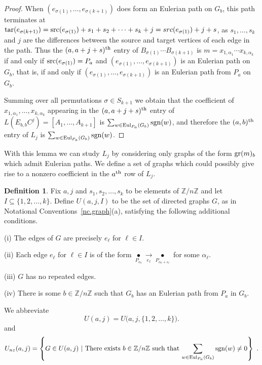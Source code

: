 \documentclass{amsproc}
\theoremstyle{definition}
\newtheorem{definition}[theorem]{Definition}
\theoremstyle{remark}
\numberwithin{equation}{section}
\newcommand{\Z}{{\mathbb Z}}
\newcommand{\sgn}{{\rm sgn}}
\newcommand{\gr}{{\rm gr}}
\newcommand{\src}{{\rm src}}
\newcommand{\tar}{{\rm tar}}
\newcommand{\uni}{{\rm Eul}}
\begin{document}
\begin{proof}
When $(e_{\sigma(1)},\dots,e_{\sigma(k+1)})$ does form an Eulerian path on $G_b$, this path terminates at $\tar(e_{\sigma(k+1)})=\src(e_{\sigma(1)})+s_1+s_2+\dots+s_k+j=src(e_{\sigma(1)})+j+s$, as $s_1,\dots,s_k$ and $j$ are the differences between the source and target vertices of each edge in the path. Thus the $(a,a+j+s)^{\rm th}$ entry of $B_{\sigma(1)}\cdots B_{\sigma(k+1)}$ is $m = x_{1,\alpha_1}\cdots x_{k,\alpha_k}$ if and only if $\src(e_{\sigma(1)})=P_a$ and $(e_{\sigma(1)},\dots,e_{\sigma(k+1)})$ is an Eulerian path on $G_b$, that is, if and only if $(e_{\sigma(1)},\dots,e_{\sigma(k+1)})$ is an Eulerian path from $P_a$ on $G_b$.

Summing over all permutations $\sigma\in S_{k+1}$ 
we obtain that the coefficient of $x_{1,\alpha_1},\dots,x_{k,\alpha_k}$ appearing in the $(a,a+j+s)^{\rm th}$ entry of 
$L(E_{b, b}C^j)=[A_1,\dots,A_{k+1}]$ is $\sum_{w\in \uni_{P_a}(G_b)}\sgn(w)$, and therefore the $(a,b)^{\rm th}$ entry of $L_j$ is $\sum_{w\in \uni_{P_a}(G_b)}\sgn(w)$.
\end{proof}

With this lemma we can study $L_j$ by considering only graphs of the form $\gr(m)_b$ which admit Eulerian paths. We define a set of graphs which could possibly give rise to a nonzero coefficient in the $a^{\rm th}$ row of $L_j$.

\begin{definition} \label{U_gen_def}
Fix $a,j$ and $s_1,s_2,\dots,s_k$ to be elements of $\Z/n\Z$ and let $I\subseteq\{1,2,\dots,k\}$. Define $U(a,j,I)$ 
to be the set of directed graphs $G$, as in Notational Conventions~\ref{nc.graph}(a), satisfying the following additional conditions.

\smallskip
(i) The edges of $G$ are precisely $e_\ell$ for $\ell\in I$.

\smallskip
(ii) Each edge $e_\ell$ for $\ell\in I$ is of the form $\underset {P_{\alpha_\ell}} \bullet \underset {e_\ell} \longrightarrow \underset {P_{\alpha_\ell+s_\ell}} \bullet$ for some $\alpha_\ell$.

\smallskip
(iii) $G$ has no repeated edges.

\smallskip
(iv) There is some $b \in \Z/n\Z$ such that $G_b$ has an Eulerian path from $P_a$ in $G_b$.

\smallskip
\noindent
We abbreviate
\[U(a,j)=U\big(a,j,\{1,2,\dots,k\}\big) . \]
and
\[U_{nz}(a,j)=\left\{G\in U(a,j)\ |\ \text{There exists $b\in\Z/n\Z$ such that $\sum_{w\in \uni_{P_a}(G_b)}\sgn(w)\neq 0$}\right\}\ .\]

\end{definition}
\end{document}
